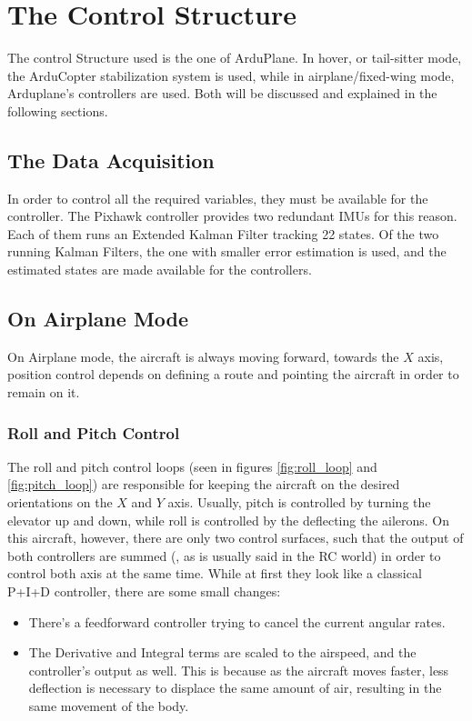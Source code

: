 \chapter{The Control Structure} \label{chap:control}

The control Structure used is the one of ArduPlane. In hover, or tail-sitter mode, the ArduCopter stabilization system is used, while in airplane/fixed-wing mode, Arduplane’s controllers are used. Both will be discussed and explained in the following sections.

\section{The Data Acquisition}

In order to control all the required variables, they must be available for the controller. The Pixhawk controller provides two redundant IMUs for this reason. Each of them runs an Extended Kalman Filter tracking 22 states\cite{kalman}\cite{kalmanArducopter}. Of the two running Kalman Filters, the one with smaller error estimation is used, and the estimated states are made available for the controllers.

\section{On Airplane Mode}

On Airplane mode, the aircraft is always moving forward, towards the $X$ axis, position control depends on defining a route and pointing the aircraft in order to remain on it.

\subsection{Roll and Pitch Control}

The roll and pitch control loops (seen in figures \ref{fig:roll_loop} and \ref{fig:pitch_loop}) are responsible for keeping the aircraft on the desired orientations on the $X$ and $Y$ axis. Usually, pitch is controlled by turning the elevator up and down, while roll is controlled by the deflecting the ailerons. On this aircraft, however, there are only two control surfaces, such that the output of both controllers are summed (, as is usually said in the RC world) in order to control both axis at the same time.
While at first they look like a classical P+I+D controller, there are some small changes:

\begin{itemize}
\item There's a feedforward controller trying to cancel the current angular rates.
\item The Derivative and Integral terms are scaled to the airspeed, and the controller's output as well. This is because  as the aircraft moves faster, less deflection is necessary to displace the same amount of air, resulting in the same movement of the body.
\end{itemize}


